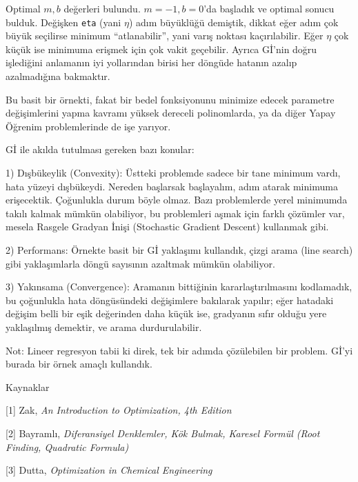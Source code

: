 \documentclass[12pt,fleqn]{article}\usepackage{../../common}
\begin{document}
Optimal $m,b$ değerleri bulundu. $m=-1, b=0$'da başladık ve optimal sonucu
bulduk. Değişken \verb!eta! (yani $\eta$) adım büyüklüğü demiştik, dikkat eğer
adım çok büyük seçilirse minimum ``atlanabilir'', yani varış noktası
kaçırılabilir. Eğer $\eta$ çok küçük ise minimuma erişmek için çok vakit
geçebilir. Ayrıca Gİ'nin doğru işlediğini anlamanın iyi yollarından birisi her
döngüde hatanın azalıp azalmadığına bakmaktır.

Bu basit bir örnekti, fakat bir bedel fonksiyonunu minimize edecek parametre
değişimlerini yapma kavramı yüksek dereceli polinomlarda, ya da diğer Yapay
Öğrenim problemlerinde de işe yarıyor.

Gİ ile akılda tutulması gereken bazı konular:

1) Dışbükeylik (Convexity): Üstteki problemde sadece bir tane minimum vardı,
hata yüzeyi dışbükeydi. Nereden başlarsak başlayalım, adım atarak minimuma
erişecektik. Çoğunlukla durum böyle olmaz. Bazı problemlerde yerel minimumda
takılı kalmak mümkün olabiliyor, bu problemleri aşmak için farklı çözümler var,
mesela Rasgele Gradyan İnişi (Stochastic Gradient Descent) kullanmak gibi.

2) Performans: Örnekte basit bir Gİ yaklaşımı kullandık, çizgi arama (line
search) gibi yaklaşımlarla döngü sayısının azaltmak mümkün olabiliyor.

3) Yakınsama (Convergence): Aramanın bittiğinin kararlaştırılmasını kodlamadık,
bu çoğunlukla hata döngüsündeki değişimlere bakılarak yapılır; eğer hatadaki
değişim belli bir eşik değerinden daha küçük ise, gradyanın sıfır olduğu yere
yaklaşılmış demektir, ve arama durdurulabilir.

Not: Lineer regresyon tabii ki direk, tek bir adımda çözülebilen bir
problem. Gİ'yi burada bir örnek amaçlı kullandık. 

Kaynaklar 

[1] Zak, {\em An Introduction to Optimization, 4th Edition}

[2] Bayramlı, {\em Diferansiyel Denklemler, Kök Bulmak, Karesel Formül (Root Finding, Quadratic Formula)}

[3] Dutta, {\em Optimization in Chemical Engineering}
\end{document}
